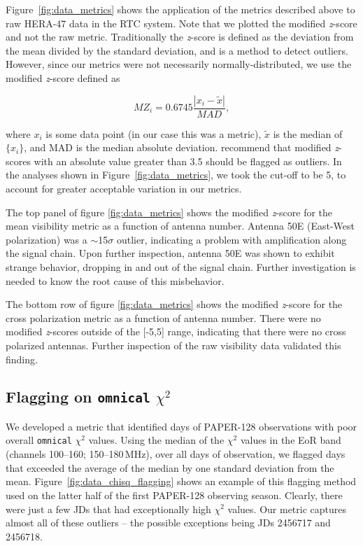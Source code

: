 Figure~\ref{fig:data_metrics} shows the application of the metrics described above to raw HERA-47 data in the RTC system. Note that we plotted the modified \textit{z}-score and not
the raw metric. Traditionally the \textit{z}-score is defined as the deviation from the
mean divided by the standard deviation, and is a method to detect outliers.
However, since our metrics were not necessarily normally-distributed, we use the
modified \textit{z}-score defined as 

\begin{equation}\label{eqn:modifiedzscore}
    MZ_{i} = 0.6745\frac{|x_{i} - \tilde{x}|} {MAD},
\end{equation}

where $x_{i}$ is some data point (in our case this was a metric),
$\tilde{x}$ is the median of ${\{x_{i}\}}$, and MAD is the median absolute
deviation. \cite{Iglewicz.10} recommend that modified
\textit{z}-scores with an absolute value greater than 3.5 should be flagged as outliers.
In the analyses shown in Figure~\ref{fig:data_metrics}, we took the cut-off to be 5, to account for greater acceptable
variation in our metrics.

The top panel of figure \ref{fig:data_metrics} shows the modified \textit{z}-score for
the mean visibility metric as a function of antenna number.
Antenna 50E (East-West polarization) was a $\sim$15$\sigma$ outlier, indicating a problem
with amplification along the signal chain. Upon further inspection,
antenna 50E was shown to exhibit strange behavior, dropping in and out of the signal chain. Further
investigation is needed to know the root cause of this misbehavior. 

The bottom row of figure \ref{fig:data_metrics} shows the modified \textit{z}-score for the cross
polarization metric as a function of antenna number. There were no modified
\textit{z}-scores outside of the [-5,5] range, indicating that there were no cross polarized
antennas. Further inspection of the raw visibility data validated this finding.

\subsection{Flagging on {\tt omnical} $\chi^2$}

We developed a metric that identified days of PAPER-128 observations with poor overall {\tt omnical} $\chi^2$ values. Using the median of the $\chi^2$ values in the EoR band (channels 100--160; 150--180\,MHz), over all days of observation, we flagged days that exceeded the average of the median by one standard deviation from the mean. Figure~\ref{fig:data_chisq_flagging} shows an example of this flagging method used on the latter half of the first PAPER-128 observing season. Clearly, there were just a few JDs that had exceptionally high $\chi^2$ values. Our metric captures almost all of these outliers -- the possible exceptions being JDs 2456717 and 2456718.

